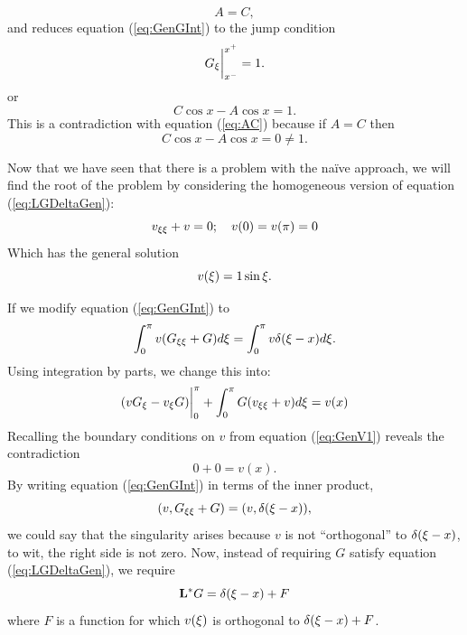     \begin{equation}\label{eq:AC}
        A=C,
    \end{equation}
    and reduces equation (\ref{eq:GenGInt}) to the jump condition 
    \begin{equation}\label{eq:genJump}
        G_\xi\biggr\rvert_{x^-}^{x^+} = 1.
    \end{equation}
    or
    \begin{equation*}
        C\cos x - A\cos x = 1.
    \end{equation*}
    This is a contradiction with equation (\ref{eq:AC}) because if \(A=C\) then 
    \begin{equation*}
        C\cos x -A\cos x = 0 \neq 1.
    \end{equation*}

    Now that we have seen that there is a problem with the na\"ive approach, we will find the root of the problem by considering the homogeneous version of equation (\ref{eq:LGDeltaGen}):
    \begin{equation}\label{eq:GenV1}
        v_{\xi\xi} + v = 0;\quad v(0)=v(\pi)=0
    \end{equation}
    Which has the general solution 
    \begin{equation*}
        v(\xi) = 1 \sin \xi.
    \end{equation*}

    If we modify equation (\ref{eq:GenGInt}) to 
    \begin{equation}\label{eq:innerCont}
            \int_{0}^{\pi} v(G_{\xi\xi}+G) d\xi = \int_{0}^{\pi} v\delta(\xi-x) d\xi.
    \end{equation}
    Using integration by parts, we change this into:
    \begin{equation*}
        (vG_\xi - v_\xi G)\biggr\rvert_{0}^{\pi} + \int_{0}^{\pi} G(v_{\xi\xi}+v)d\xi = v(x) 
    \end{equation*}
    Recalling the boundary conditions on \(v\) from equation (\ref{eq:GenV1}) reveals the contradiction
    \begin{equation*}
        0+0 = v(x).
    \end{equation*}
    By writing equation (\ref{eq:GenGInt}) in terms of the inner product,
    \begin{equation*}
        (v, G_{\xi\xi}+G) = (v, \delta(\xi-x)),
    \end{equation*}
    we could say that the singularity arises because \(v\) is not ``orthogonal'' to \(\delta(\xi-x)\), to wit, the right side is not zero. Now, instead of requiring \(G\) satisfy equation (\ref{eq:LGDeltaGen}), we require
    \begin{equation}\label{eq:GenCorrection}
        \mathrm{\bf{L^*}} G = \delta(\xi-x) + F
    \end{equation}
    where \(F\) is a function for which \(v(\xi)\) is orthogonal to \(\delta(\xi-x) + F\). 

